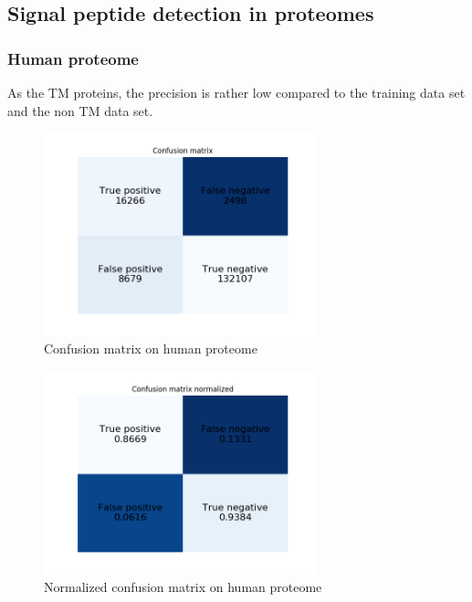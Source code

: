\subsection{Signal peptide detection in proteomes}

\subsubsection{Human proteome}

As the TM proteins, the precision is rather low compared to the training data set and the non TM data set.

\begin{figure}[H]
\center
\includegraphics[width=0.7\textwidth]{pictures/human_cm.png}
\caption{\label{fig:human_cm}Confusion matrix on human proteome}
\end{figure}

\begin{figure}[H]
\center
\includegraphics[width=0.7\textwidth]{pictures/human_cm_normalized.png}
\caption{\label{fig:human_normalized_cm}Normalized confusion matrix on human proteome}
\end{figure}

